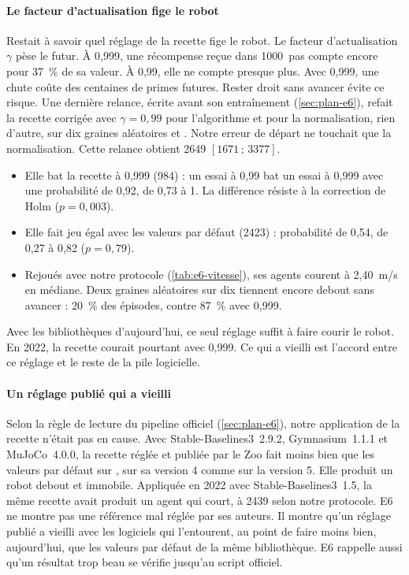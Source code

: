 \paragraph{Le facteur d'actualisation fige le robot}
Restait à savoir quel réglage de la recette fige le robot. Le facteur d'actualisation $\gamma$ pèse le futur.
À 0,999, une récompense reçue dans \num{1000}~pas compte encore pour 37~\% de sa valeur. À 0,99, elle ne
compte presque plus. Avec 0,999, une chute coûte des centaines de primes futures. Rester droit sans avancer
évite ce risque. Une dernière relance, écrite avant son entraînement (\cref{sec:plan-e6}), refait la
recette corrigée avec $\gamma = 0{,}99$ pour l'algorithme et pour la normalisation, rien d'autre, sur dix
graines aléatoires et . Notre erreur de départ ne touchait que la normalisation. Cette
relance obtient \num{2649} $[\num{1671}\,;\,\num{3377}]$.
\begin{itemize}
  \item Elle bat la recette à 0,999 (\num{984}) : un essai à 0,99 bat un essai à 0,999 avec une probabilité
    de 0,92, de 0,73 à 1. La différence résiste à la correction de Holm ($p=0{,}003$).
  \item Elle fait jeu égal avec les valeurs par défaut (\num{2423}) : probabilité de 0,54, de 0,27 à 0,82
    ($p=0{,}79$).
  \item Rejoués avec notre protocole (\cref{tab:e6-vitesse}), ses agents courent à 2,40~m/s en médiane. Deux
    graines aléatoires sur dix tiennent encore debout sans avancer : 20~\% des épisodes, contre 87~\% avec
    0,999.
\end{itemize}
Avec les bibliothèques d'aujourd'hui, ce seul réglage suffit à faire courir le robot. En 2022, la recette
courait pourtant avec 0,999. Ce qui a vieilli est l'accord entre ce réglage et le reste de la pile logicielle.

\paragraph{Un réglage publié qui a vieilli}
Selon la règle de lecture du pipeline officiel (\cref{sec:plan-e6}), notre application de la recette n'était pas en cause. Avec
Stable-Baselines3~2.9.2, Gymnasium~1.1.1 et MuJoCo~4.0.0, la recette réglée et publiée par le Zoo fait
moins bien que les valeurs par défaut sur , sur sa version 4 comme sur la version 5. Elle produit
un robot debout et immobile. Appliquée en 2022 avec Stable-Baselines3~1.5, la même recette avait produit un
agent qui court, à \num{2439} selon notre protocole. E6 ne montre pas une référence mal réglée par ses
auteurs. Il montre qu'un réglage publié a vieilli avec les logiciels qui l'entourent, au point de faire moins
bien, aujourd'hui, que les valeurs par défaut de la même bibliothèque. E6 rappelle aussi qu'un résultat trop
beau se vérifie jusqu'au script officiel.


